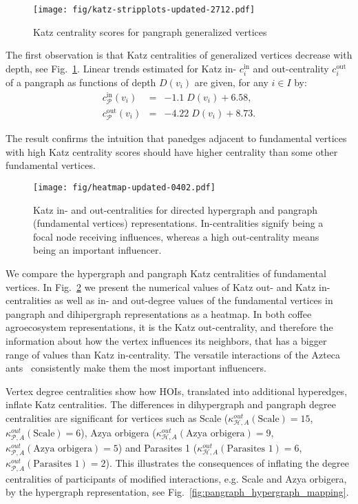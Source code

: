 \documentclass[a4paper,12pt]{article}
\theoremstyle{definition}
\theoremstyle{remark}
\newcommand{\mH}{\mathcal{H}}
\newcommand{\mP}{\mathcal{P}}
\newcommand{\tin}{\mathrm{in}}
\newcommand{\out}{\mathrm{out}}
\begin{document}
\begin{figure}[ht]
    \centering
    \texttt{[image: fig/katz-stripplots-updated-2712.pdf]}
    \caption{Katz centrality scores for pangraph generalized vertices}
    \label{fig:katz-stripplots-updated}
\end{figure}

The first observation is that Katz centralities of generalized vertices decrease with depth, see Fig.~\ref{fig:katz-stripplots-updated}. Linear trends estimated for Katz in- $c_i^{\tin}$ and out-centrality $c_i^{\out}$ of a pangraph as functions of depth $D(v_i)$ are given, for any $i\in I$ by:
\begin{eqnarray*}
    c_{\mP}^{\tin}(v_i) &=& -1.1 \; D(v_i) + 6.58, \\
    c_{\mP}^{\out}(v_i) &=& -4.22 \; D(v_i) + 8.73.
\end{eqnarray*}

The result confirms the intuition that panedges adjacent to fundamental vertices with high Katz centrality scores should have higher centrality than some other fundamental vertices.  

\begin{figure}[h!]
    \centering\texttt{[image: fig/heatmap-updated-0402.pdf]}
    \caption{Katz in- and out-centralities for directed hypergraph and pangraph (fundamental vertices)
representations. In-centralities signify being a focal node receiving influences, whereas a high out-centrality means being an important influencer.}
    \label{fig:centralities-heatmap-updated}
\end{figure}

We compare the hypergraph and pangraph Katz centralities of fundamental vertices. In Fig.~\ref{fig:centralities-heatmap-updated} we present the numerical values of Katz out- and Katz in-centralities as well as in- and out-degree values of the fundamental vertices in pangraph and dihipergraph representations as a heatmap. In both coffee agroecosystem representations, it is the Katz out-centrality, and therefore the information about how the vertex influences its neighbors, that has a bigger range of values than Katz in-centrality. The versatile interactions of the Azteca ants~\cite{Vandermeer_2010, Perfecto_coffe_agroeco} consistently make them the most important influencers.


Vertex degree centralities show how HOIs, translated into additional hyperedges, inflate Katz centralities. The differences in dihypergraph and pangraph degree centralities are significant for vertices such as Scale ($\kappa_{\mH,A}^{out}(\textrm{Scale})=15$, $\kappa_{\mP,A}^{out}(\textrm{Scale})=6$), Azya orbigera ($\kappa_{\mH,A}^{out}(\textrm{Azya orbigera})=9$, $\kappa_{\mP,A}^{out}(\textrm{Azya orbigera})=5$) and Parasites 1 ($\kappa_{\mH,A}^{out}(\textrm{Parasites 1})=6$, $\kappa_{\mP,A}^{out}(\textrm{Parasites 1})=2$). This illustrates the consequences of inflating the degree centralities of participants of modified interactions, e.g. Scale and Azya orbigera, by the hypergraph representation, see Fig.~\ref{fig:pangraph_hypergraph_mapping}. 
\end{document}
